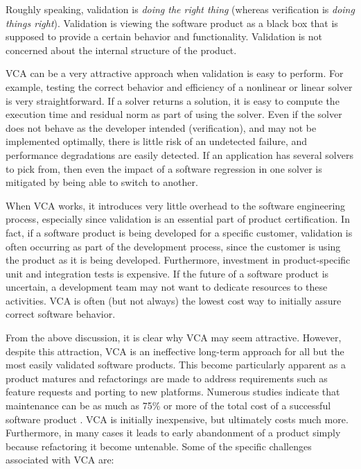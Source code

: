 \documentclass[11pt]{SANDreport}
\begin{document}
Roughly speaking, validation is \textit{doing the right thing}
(whereas verification is \textit{doing things right}).  Validation is
viewing the software product as a black box that is supposed to
provide a certain behavior and functionality.  Validation is not
concerned about the internal structure of the product.

VCA can be a very attractive approach when validation is easy to
perform.  For example, testing the correct behavior and efficiency of
a nonlinear or linear solver is very straightforward.  If a solver
returns a solution, it is easy to compute the execution time and
residual norm as part of using the solver.  Even if the solver does
not behave as the developer intended (verification), and may not be
implemented optimally, there is little risk of an undetected failure,
and performance degradations are easily detected.  If an application
has several solvers to pick from, then even the impact of a software
regression in one solver is mitigated by being able to switch to
another.

When VCA works, it introduces very little overhead to the software
engineering process, especially since validation is an essential part
of product certification.  In fact, if a software product is being
developed for a specific customer, validation is often occurring as
part of the development process, since the customer is using the
product as it is being developed.  Furthermore, investment in
product-specific unit and integration tests is expensive.  If the
future of a software product is uncertain, a development team may not
want to dedicate resources to these activities.  VCA is often (but not
always) the lowest cost way to initially assure correct software
behavior.

From the above discussion, it is clear why VCA may seem attractive.
However, despite this attraction, VCA is an ineffective long-term
approach for all but the most easily validated software products.
This become particularly apparent as a product matures and
refactorings are made to address requirements such as feature requests
and porting to new platforms.  Numerous studies indicate that
maintenance can be as much as 75\% or more of the total cost of a
successful software product {}\cite{CodeComplete2nd04}.  VCA is
initially inexpensive, but ultimately costs much more.  Furthermore,
in many cases it leads to early abandonment of a product simply
because refactoring it become untenable.  Some of the specific
challenges associated with VCA are:
\end{document}
